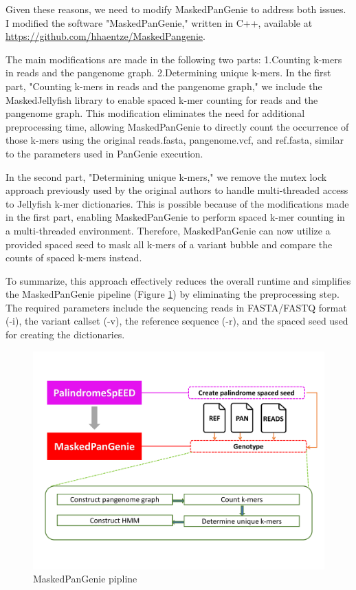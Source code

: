 \documentclass{PHlab-thesis}
\begin{document}
Given these reasons, we need to modify MaskedPanGenie to address both issues. I modified the software "MaskedPanGenie," written in C++, available at \url{https://github.com/hhaentze/MaskedPangenie}.

The main modifications are made in the following two parts: 1.Counting k-mers in reads and the pangenome graph. 2.Determining unique k-mers. In the first part, "Counting k-mers in reads and the pangenome graph," we include the MaskedJellyfish library to enable spaced k-mer counting for reads and the pangenome graph. This modification eliminates the need for additional preprocessing time, allowing MaskedPanGenie to directly count the occurrence of those k-mers using the original reads.fasta, pangenome.vcf, and ref.fasta, similar to the parameters used in PanGenie execution.

In the second part, "Determining unique k-mers," we remove the mutex lock approach previously used by the original authors to handle multi-threaded access to Jellyfish k-mer dictionaries. This is possible because of the modifications made in the first part, enabling MaskedPanGenie to perform spaced k-mer counting in a multi-threaded environment. Therefore, MaskedPanGenie can now utilize a provided spaced seed to mask all k-mers of a variant bubble and compare the counts of spaced k-mers instead.

To summarize, this approach effectively reduces the overall runtime and simplifies the MaskedPanGenie pipeline (Figure \ref{fig:MaskedPanGenie_revised}) by eliminating the preprocessing step. The required parameters include the sequencing reads in FASTA/FASTQ format (-i), the variant callset (-v), the reference sequence (-r), and the spaced seed used for creating the dictionaries.
\begin{figure}
	\centering
	\includegraphics[scale=0.18]{figures/MaskedPanGenie_revised.png}
	\caption{MaskedPanGenie pipline}
	\label{fig:MaskedPanGenie_revised} %
\end{figure}
\end{document}
